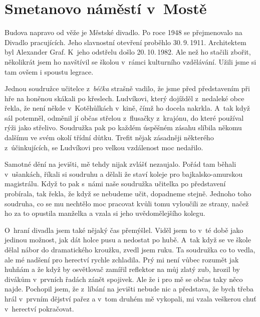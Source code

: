
\chapter{Smetanovo náměstí v~Mostě}

Budova napravo od věže je Městské divadlo. Po roce 1948 se přejmenovalo na
Divadlo pracujících. Jeho slavnostní otevření proběhlo 30.\,9.\,1911.
Architektem byl Alexander Graf. K~jeho odstřelu došlo 20.\,10.\,1982. Ale než
ho stačili zbořit, několikrát jsem ho navštívil se školou v~rámci kulturního
vzdělávání. Užili jsme si tam ovšem i spoustu legrace.

Jednou soudružce učitelce z~{\em béčka} strašně vadilo, že jsme před
představením při hře na honěnou skákali po křeslech. Ludvíkovi, který dojížděl
z~nedaleké obce řekla, že není někde v~Kotěhůlkách v~kině, čímž ho docela
nakrkla. A~tak když sál potemněl, odměnil jí občas střelou z~flusačky
z~krajónu, do které používal rýži jako střelivo. Soudružka pak po každém
úspěšném zásahu slíbila někomu dalšímu ve svém okolí třídní důtku. Trefit nějak
zásadněji některého z~účinkujících, se Ludvíkovi pro velkou vzdálenost moc
nedařilo.

Samotné dění na jevišti, mě tehdy nijak zvlášť nezaujalo. Pořád tam běhali
v~ušankách, říkali si soudruhu a dělali že staví koleje pro bajkalsko-amurskou
magistrálu. Když to pak s~námi naše soudružka učitelka po představení
probírala, tak řekla, že když se nebudeme učit, dopadneme stejně. Jednoho toho
soudruha, co se mu nechtělo moc pracovat kvůli tomu vyloučili ze strany, načež
ho za to opustila manželka a vzala si jeho uvědomělejšího kolegu.

O~hraní divadla jsem také nějaký čas přemýšlel. Viděl jsem to v~té době jako
jedinou možnost, jak dát holce pusu a nedostat po hubě. A~tak když se ve škole
dělal nábor do dramatického kroužku, zvedl jsem ruku. Ta soudružka co to vedla,
ale mé nadšení pro herectví rychle zchladila. Prý mi není vůbec rozumět jak
huhňám a že když by osvětlovač zamířil reflektor na můj zlatý zub, hrozil by
divákům v~prvních řadách zánět spojivek. Ale že i pro mě se občas taky něco
najde. Pochopil jsem, že z~líbání na jevišti nebude nic a představa, že bych
třeba hrál v~prvním dějství pařez a v~tom druhém mě vykopali, mi vzala veškerou
chuť v~herectví pokračovat.


